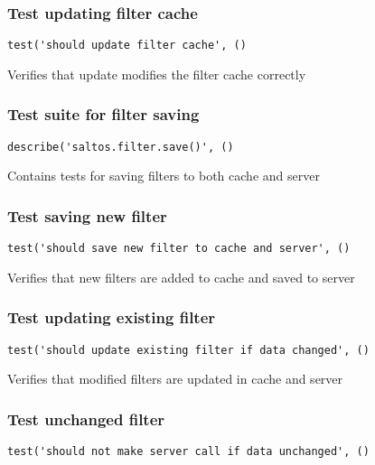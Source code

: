\documentclass[a4paper]{article}
\begin{document}
\hypertarget{toc594}{}
\subsubsection{Test updating filter cache}

\begin{lstlisting}
test('should update filter cache', ()
\end{lstlisting}

Verifies that update modifies the filter cache correctly

\hypertarget{toc595}{}
\subsubsection{Test suite for filter saving}

\begin{lstlisting}
describe('saltos.filter.save()', ()
\end{lstlisting}

Contains tests for saving filters to both cache and server

\hypertarget{toc596}{}
\subsubsection{Test saving new filter}

\begin{lstlisting}
test('should save new filter to cache and server', ()
\end{lstlisting}

Verifies that new filters are added to cache and saved to server

\hypertarget{toc597}{}
\subsubsection{Test updating existing filter}

\begin{lstlisting}
test('should update existing filter if data changed', ()
\end{lstlisting}

Verifies that modified filters are updated in cache and server

\hypertarget{toc598}{}
\subsubsection{Test unchanged filter}

\begin{lstlisting}
test('should not make server call if data unchanged', ()
\end{lstlisting}
\end{document}
